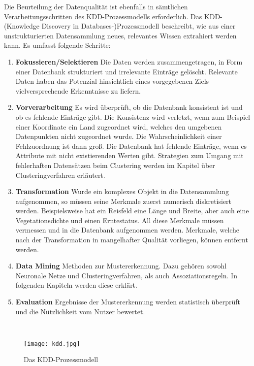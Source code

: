 \documentclass[11pt,ceqn]{book}
\begin{document}
Die Beurteilung der Datenqualität ist ebenfalls in sämtlichen Verarbeitungsschritten des KDD-Prozessmodells \cite{kddmod} erforderlich. Das KDD-(Knowledge Discovery in Databases-)Prozessmodell  beschreibt, wie aus einer unstrukturierten Datensammlung neues, relevantes Wissen extrahiert werden kann. Es umfasst folgende Schritte:
\begin{enumerate}
\item \textbf{Fokussieren/Selektieren} Die Daten werden zusammengetragen, in Form einer Datenbank strukturiert und irrelevante Einträge gelöscht. Relevante Daten haben das Potenzial hinsichtlich eines vorgegebenen Ziels vielversprechende Erkenntnisse zu liefern.
\item \textbf{Vorverarbeitung} Es wird überprüft, ob die Datenbank konsistent ist und ob es fehlende Einträge gibt. Die Konsistenz wird verletzt, wenn zum Beispiel einer Koordinate ein Land zugeordnet wird, welches den umgebenen Datenpunkten nicht zugeordnet wurde. Die Wahrscheinlichkeit einer Fehlzuordnung ist dann groß. Die Datenbank hat fehlende Einträge, wenn es Attribute mit nicht existierenden Werten gibt. Strategien zum Umgang mit fehlerhaften Datensätzen beim Clustering werden im Kapitel über Clusteringverfahren erläutert.
\item \textbf{Transformation} Wurde ein komplexes Objekt in die Datensammlung aufgenommen, so müssen seine Merkmale zuerst numerisch diskretisiert werden. Beispielsweise hat ein Reisfeld eine Länge und Breite, aber auch eine Vegetationsdichte und einen Erntestatus. All diese Merkmale müssen vermessen und in die Datenbank aufgenommen werden. Merkmale, welche nach der Transformation in mangelhafter Qualität vorliegen, können entfernt werden.
\item \textbf{Data Mining} Methoden zur Mustererkennung. Dazu gehören sowohl Neuronale Netze und Clusteringverfahren, als auch Assoziationsregeln. In folgenden Kapiteln werden diese erklärt.
\item \textbf{Evaluation} Ergebnisse der Mustererkennung werden statistisch überprüft und die Nützlichkeit vom Nutzer bewertet.
\end{enumerate}~\\


\begin{figure}[H]
\centering
\texttt{[image: kdd.jpg]}
\caption{Das KDD-Prozessmodell \protect\footnotemark}
\end{figure}
\end{document}
